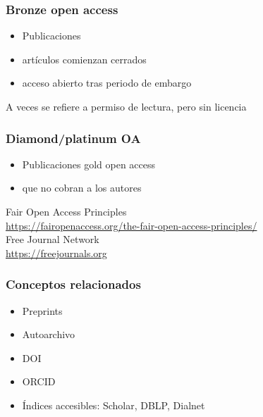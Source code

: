 \documentclass[17pt,aspectratio=169]{beamer}
\begin{document}
\begin{frame}
\frametitle{Bronze open access}

\begin{itemize}
\item Publicaciones
\item artículos comienzan cerrados
\item acceso abierto tras periodo de embargo
\end{itemize}

A veces se refiere a permiso de lectura, pero sin licencia

\end{frame}

\begin{frame}
\frametitle{Diamond/platinum OA}

\begin{itemize}
\item Publicaciones gold open access
\item que no cobran a los autores
\end{itemize}

\begin{flushright}
  Fair Open Access Principles \\
  {\small \url{https://fairopenaccess.org/the-fair-open-access-principles/}} \\
  Free Journal Network \\
  {\small \url{https://freejournals.org}} \\
\end{flushright}
\end{frame}

\begin{frame}
\frametitle{Conceptos relacionados}

\begin{itemize}
\item Preprints
\item Autoarchivo
\item DOI
\item ORCID
\item Índices accesibles: Scholar, DBLP, Dialnet
\end{itemize}

\end{frame}

\end{document}
